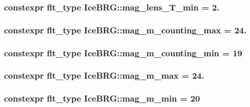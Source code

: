 \subsubsection[{mag\+\_\+lens\+\_\+\+T\+\_\+min}]{\setlength{\rightskip}{0pt plus 5cm}constexpr {\bf flt\+\_\+type} Ice\+B\+R\+G\+::mag\+\_\+lens\+\_\+\+T\+\_\+min = 2.}\label{namespaceIceBRG_ac8678d1f61a28341bc7157159256bb3b}
\hypertarget{namespaceIceBRG_ac6de07edf41f9e5c1c7e8c5f1689f17c}{}
\subsubsection[{mag\+\_\+m\+\_\+counting\+\_\+max}]{\setlength{\rightskip}{0pt plus 5cm}constexpr {\bf flt\+\_\+type} Ice\+B\+R\+G\+::mag\+\_\+m\+\_\+counting\+\_\+max = 24.}\label{namespaceIceBRG_ac6de07edf41f9e5c1c7e8c5f1689f17c}
\hypertarget{namespaceIceBRG_a94be0eaeb0bfcdc8dae4a1aa020b5e60}{}
\subsubsection[{mag\+\_\+m\+\_\+counting\+\_\+min}]{\setlength{\rightskip}{0pt plus 5cm}constexpr {\bf flt\+\_\+type} Ice\+B\+R\+G\+::mag\+\_\+m\+\_\+counting\+\_\+min = 19}\label{namespaceIceBRG_a94be0eaeb0bfcdc8dae4a1aa020b5e60}
\hypertarget{namespaceIceBRG_afe312c946480f9d2fa951168035a3a09}{}
\subsubsection[{mag\+\_\+m\+\_\+max}]{\setlength{\rightskip}{0pt plus 5cm}constexpr {\bf flt\+\_\+type} Ice\+B\+R\+G\+::mag\+\_\+m\+\_\+max = 24.}\label{namespaceIceBRG_afe312c946480f9d2fa951168035a3a09}
\hypertarget{namespaceIceBRG_af21cb728e53beb5bc6bf61e06d466535}{}
\subsubsection[{mag\+\_\+m\+\_\+min}]{\setlength{\rightskip}{0pt plus 5cm}constexpr {\bf flt\+\_\+type} Ice\+B\+R\+G\+::mag\+\_\+m\+\_\+min = 20}\label{namespaceIceBRG_af21cb728e53beb5bc6bf61e06d466535}
\hypertarget{namespaceIceBRG_a0dc0ffd6663af1f01df1e07c25556a13}{}
